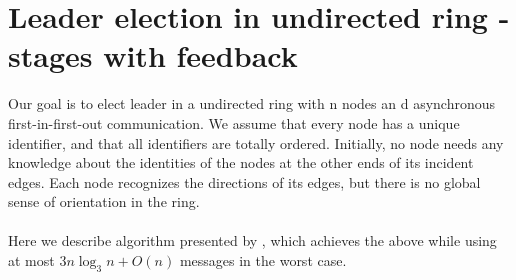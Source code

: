 \documentclass{article}
\begin{document}
\section*{Leader election in undirected ring - stages with feedback}
Our goal is to elect leader in a undirected ring with n nodes an d asynchronous first-in-first-out communication.  We assume that every node has a unique identifier, and that all identifiers are
totally ordered. Initially, no node needs any knowledge about the identities of the nodes at the
other ends of its incident edges. Each node recognizes the directions of its edges, but there is no global sense of orientation in the ring. 
\\ \\
Here we describe algorithm presented by \cite{ROTEM1987575}, which achieves the above while using at most $3 n\log_{3}n + O(n)$ messages in the worst case.
\end{document}
